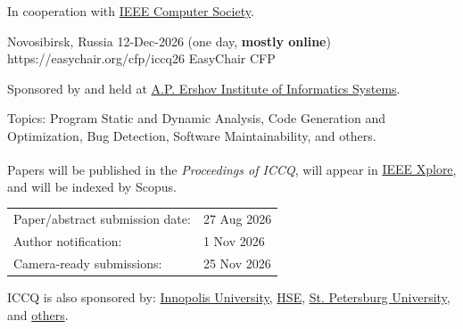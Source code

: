 \documentclass{../cfp}
\begin{document}
\PrintLogo{}



In cooperation
with
\href{https://conferences.ieee.org/conferences_events/conferences/conferencedetails/72368}{IEEE Computer Society}.

\vspace{6pt}

\PrintAddress
  {Novosibirsk, Russia}
  {12-Dec-2026 (one day, \textbf{mostly online})}
  {https://easychair.org/cfp/iccq26}
  {EasyChair CFP}

\vspace{12pt}
%
%
\vspace{12pt}

Sponsored by and held at \href{https://www.iis.nsk.su/en}{A.P. Ershov Institute of Informatics Systems}.

Topics: Program Static and Dynamic Analysis,
Code Generation and Optimization,
Bug Detection, Software Maintainability, and others.

Papers will be published in the \textit{Proceedings of ICCQ},
will appear in \href{https://ieeexplore.ieee.org/Xplore/home.jsp}{IEEE Xplore\textsuperscript{\textregistered}},
and will be indexed by Scopus.

\begin{tabular}{@{}ll}
Paper/abstract submission date: & 27 Aug 2026 \\
Author notification: & 1 Nov 2026 \\
Camera-ready submissions: & 25 Nov 2026
\end{tabular}

\vspace{6pt}
ICCQ is also sponsored by:
\href{https://innopolis.university/}{Innopolis University},
\href{https://hse.ru/}{HSE},
\href{https://english.spbu.ru/}{St. Petersburg University},
and \href{https://www.iccq.ru/2026.html#partners}{others}.
\end{document}
